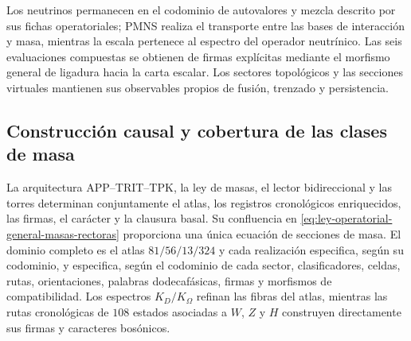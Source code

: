 

Los neutrinos permanecen en el codominio de autovalores y mezcla descrito por sus
fichas operatoriales; PMNS realiza el transporte entre las bases de interacción y
masa, mientras la escala pertenece al espectro del operador neutrínico. Las seis
evaluaciones compuestas se obtienen de firmas explícitas mediante el morfismo
general de ligadura hacia la carta escalar. Los sectores topológicos y las secciones virtuales mantienen sus
observables propios de fusión, trenzado y persistencia.

\subsection{Construcción causal y cobertura de las clases de masa}

La arquitectura APP--TRIT--TPK, la ley de masas, el lector bidireccional y
las torres determinan conjuntamente el atlas, los registros cronológicos
enriquecidos, las firmas, el carácter y la clausura basal. Su confluencia en
\eqref{eq:ley-operatorial-general-masas-rectoras} proporciona una única
ecuación de secciones de masa. El dominio completo es el atlas \(81/56/13/324\) y cada realización especifica, según su codominio,
y especifica, según el codominio de cada sector, clasificadores, celdas, rutas,
orientaciones, palabras dodecafásicas, firmas y morfismos de compatibilidad. Los
espectros \(K_D/K_\Omega\) refinan las fibras del atlas, mientras las rutas
cronológicas de \(108\) estados asociadas a \(W\), \(Z\) y \(H\) construyen
directamente sus firmas y caracteres bosónicos.
